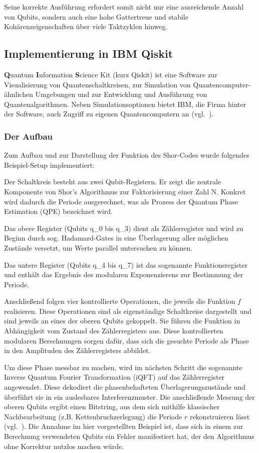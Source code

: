 Seine korrekte Ausführung erfordert somit nicht nur eine ausreichende Anzahl von Qubits, sondern auch eine hohe Gattertreue und stabile Kohärenzeigenschaften über viele Taktzyklen hinweg.

\subsection{Implementierung in IBM Qiskit}
\textbf{Q}uantum \textbf{I}nformation \textbf{S}cience Kit (kurz Qiskit) ist eine Software zur Visualisierung von Quantenschaltkreisen, zur Simulation von Quantencomputer-ähnlichen Umgebungen und zur Entwicklung und Ausführung von Quantenalgorithmen. Neben Simulationsoptionen bietet IBM, die Firma hinter der Software, auch Zugriff zu eigenen Quantencomputern an (vgl.~\cite{frank_zickert_how_2023}).

\subsubsection{Der Aufbau}
Zum Aufbau und zur Darstellung der Funktion des Shor-Codes wurde folgendes Beispiel-Setup implementiert:


Der Schaltkreis besteht aus zwei Qubit-Registern. Er zeigt die zentrale Komponente von Shor's Algorithmus zur Faktorisierung einer Zahl N. Konkret wird dadurch die Periode ausgerechnet, was als Prozess der
Quantum Phase Estimation (QPE) bezeichnet wird.

Das obere Register (Qubits q\_0 bis q\_3) dient als Zählerregister und wird zu Beginn durch sog. Hadamard-Gates in eine Überlagerung aller möglichen Zustände versetzt, um Werte parallel untersuchen zu können.

Das untere Register (Qubits q\_4 bis q\_7) ist das sogenannte Funktionsregister und enthält das Ergebnis des modularen Exponenzierens zur Bestimmung der Periode.

Anschließend folgen vier kontrollierte Operationen, die jeweils die Funktion $f$ realisieren. Diese Operationen sind als eigenständige Schaltkreise dargestellt und sind jeweils an eines der oberen Qubits gekoppelt. Sie führen die Funktion in Abhängigkeit vom Zustand des Zählerregisters aus. Diese kontrollierten modularen Berechnungen sorgen dafür, dass sich die gesuchte Periode als Phase in den Amplituden des Zählerregisters abbildet.

Um diese Phase messbar zu machen, wird im nächsten Schritt die sogenannte Inverse Quantum Fourier Transformation (iQFT) auf das Zählerregister angewendet. Diese dekodiert die phasenbehafteten Überlagerungszustände und überführt sie in ein auslesbares Interferenzmuster. Die anschließende Messung der oberen Qubits ergibt einen Bitstring, aus dem sich mithilfe klassischer Nachbearbeitung (z.B. Kettenbruchzerlegung) die Periode $r$ rekonstruieren lässt (vgl.~\cite{frank_zickert_how_2023}).
Die Annahme im hier vorgestellten Beispiel ist, dass sich in einem zur Berechnung verwendeten Qubits ein Fehler manifestiert hat, der den Algorithmus ohne Korrektur nutzlos machen würde.

